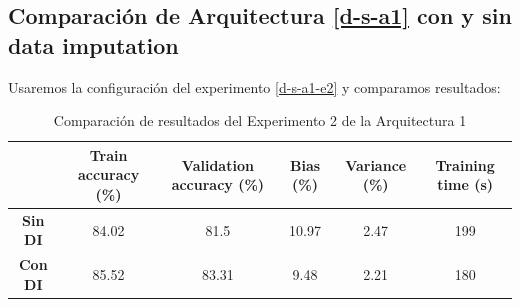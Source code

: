 \documentclass{article}
\begin{document}
		\subsection{Comparaci\'on de Arquitectura \ref{d-s-a1} con y sin data imputation}
		\label{d-s-dp-1}
			Usaremos la configuraci\'on del experimento \ref{d-s-a1-e2} y comparamos resultados:
			\begin{table}[!h]
				\begin{center}
					\begin{tabular}{ c | c | c | c | c | c |}
						\ & \textbf{Train accuracy (\%)} & \textbf{Validation accuracy (\%)} & \textbf{Bias (\%)} & \textbf{Variance (\%)} & \textbf{Training time (s)} \\ \hline
						\textbf{Sin DI} & 84.02 & 81.5 & 10.97 & 2.47 & 199\\ \hline
						\textbf{Con DI} & 85.52 & 83.31 & 9.48 & 2.21 & 180 \\ \hline
					\end{tabular}
					\caption{Comparaci\'on de resultados del Experimento 2 de la Arquitectura 1}
					\label{tab:res-d-a1-e2}
				\end{center}
			\end{table}
			
\end{document}
